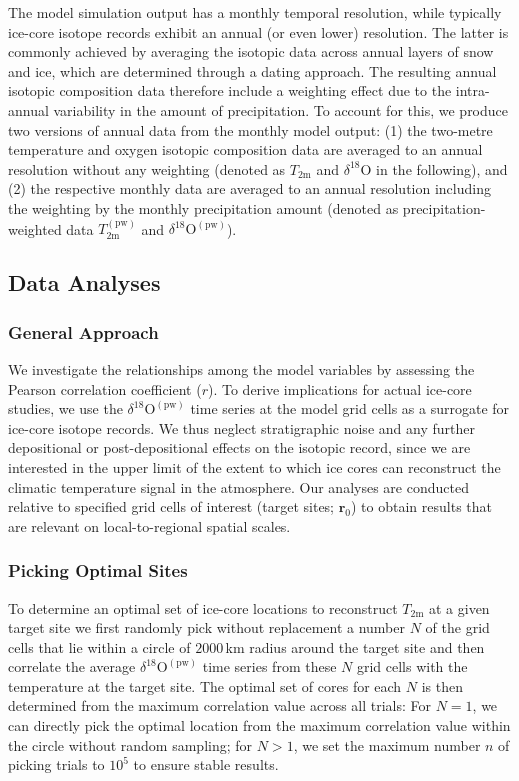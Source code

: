 \documentclass[draft]{agujournal2019}
\begin{document}
The model simulation output has a monthly temporal resolution, while typically
ice-core isotope records exhibit an annual (or even lower) resolution. The
latter is commonly achieved by averaging the isotopic data across annual layers
of snow and ice, which are determined through a dating approach. The resulting
annual isotopic composition data therefore include a weighting effect due to the
intra-annual variability in the amount of precipitation. To account for this, we
produce two versions of annual data from the monthly model output: (1) the
two-metre temperature and oxygen isotopic composition data are averaged to an
annual resolution without any weighting (denoted as $T_{2\mathrm{m}}$ and
$\delta^{18}\mathrm{O}$ in the following), and (2) the respective monthly data
are averaged to an annual resolution including the weighting by the monthly
precipitation amount (denoted as precipitation-weighted data
$T_{2\mathrm{m}}^{\mathrm{(pw)}}$ and $\delta^{18}\mathrm{O}^{\mathrm{(pw)}}$).

\subsection{Data Analyses}\label{methods:main}

\subsubsection{General Approach}\label{methods:general}

We investigate the relationships among the model variables by assessing the
Pearson correlation coefficient ($r$). To derive implications for actual
ice-core studies, we use the $\delta^{18}\mathrm{O}^{\mathrm{(pw)}}$ time series
at the model grid cells as a surrogate for ice-core isotope records. We thus
neglect stratigraphic noise and any further depositional or post-depositional
effects on the isotopic record, since we are interested in the upper limit of
the extent to which ice cores can reconstruct the climatic temperature signal in
the atmosphere. Our analyses are conducted relative to specified grid cells of
interest (target sites; $\mathbf{r}_0$) to obtain results that are relevant on
local-to-regional spatial scales.

\subsubsection{Picking Optimal Sites}\label{methods:picking}

To determine an optimal set of ice-core locations to reconstruct
$T_{2\mathrm{m}}$ at a given target site we first randomly pick without
replacement a number $N$ of the grid cells that lie within a circle of
$2000$\,km radius around the target site and then correlate the average
$\delta^{18}\mathrm{O}^{\mathrm{(pw)}}$ time series from these $N$ grid cells
with the temperature at the target site. The optimal set of cores for each $N$
is then determined from the maximum correlation value across all trials: For
$N=1$, we can directly pick the optimal location from the maximum correlation
value within the circle without random sampling; for $N>1$, we set the maximum
number $n$ of picking trials to $10^5$ to ensure stable results.
\end{document}
